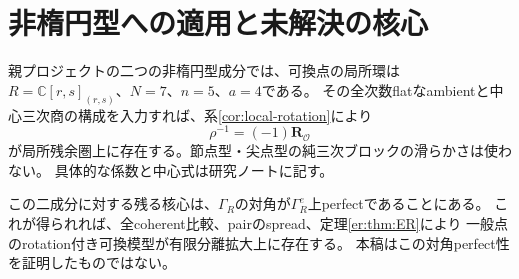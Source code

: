 \documentclass[a4paper,10pt]{ltjsarticle}
\theoremstyle{definition}
\theoremstyle{remark}
\newcommand{\CC}{\mathbb C}
\newcommand{\OO}{\mathcal O}
\newcommand{\RR}{\mathbf R}
\begin{document}
\section{非楕円型への適用と未解決の核心}\label{sec:remaining}
親プロジェクトの二つの非楕円型成分では、可換点の局所環は
$R=\CC[r,s]_{(r,s)}$、$N=7$、$n=5$、$a=4$である。
その全次数flatなambientと中心三次商の構成を入力すれば、系\ref{cor:local-rotation}により
\[
 \rho^{-1}=(-1)\RR_{\OO}
\]
が局所残余圏上に存在する。節点型・尖点型の純三次ブロックの滑らかさは使わない。
具体的な係数と中心式は研究ノートに記す。

この二成分に対する残る核心は、$\Gamma_R$の対角が$\Gamma_R^e$上perfectであることにある。
これが得られれば、全coherent比較、pairのspread、定理\ref{er:thm:ER}により
一般点のrotation付き可換模型が有限分離拡大上に存在する。
本稿はこの対角perfect性を証明したものではない。
\end{document}
